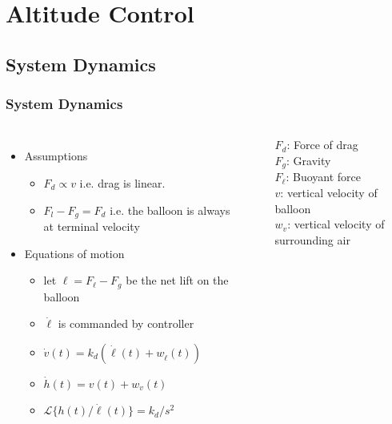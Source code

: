 \documentclass[10pt,mathserif]{beamer}
\begin{document}
\section{Altitude Control}
\subsection{System Dynamics}

\begin{frame}
\frametitle{System Dynamics}
\begin{columns}
\begin{itemize}\itemsep=12pt
\item Assumptions
\vspace*{0.5em}
\begin{itemize}
\item $F_d \propto v$ i.e. drag is linear.
\item $F_l - F_g = F_d$ i.e. the balloon is always at terminal velocity 
\end{itemize}
\item Equations of motion
\vspace*{0.5em}
\begin{itemize}
\item let $\ell = F_{\ell} - F_g$ be the net lift on the balloon
\item $\dot \ell$ is commanded by controller
\item $\dot v(t) = k_d (\dot \ell(t) + w_{\dot \ell} (t))$
\item $\dot h(t) = v(t) +  w_v(t)$
\item $\mathcal{L}\{h(t) / \dot \ell (t) \} = k_{d} / s^2$
\end{itemize}
\end{itemize}


\begin{center}
\end{center}
$F_d$: Force of drag\\
$F_g$: Gravity\\
$F_{\ell}$: Buoyant force\\
$v$: vertical velocity of balloon\\
$w_v$: vertical velocity of surrounding air
\end{columns}
\end{frame}
\end{document}
